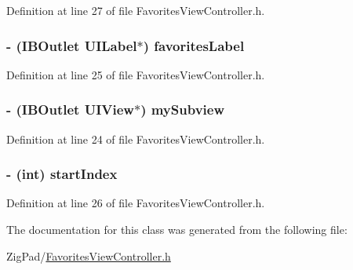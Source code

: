 Definition at line 27 of file FavoritesViewController.h.

\hypertarget{interface_favorites_view_controller_af00ceee5705d944d57b8c8e46d3cca55}{
\subsubsection[{favoritesLabel}]{\setlength{\rightskip}{0pt plus 5cm}-\/ (IBOutlet UILabel$\ast$) favoritesLabel}}
\label{interface_favorites_view_controller_af00ceee5705d944d57b8c8e46d3cca55}


Definition at line 25 of file FavoritesViewController.h.

\hypertarget{interface_favorites_view_controller_acc52a7c4d35472a5e41a1e078081435b}{
\subsubsection[{mySubview}]{\setlength{\rightskip}{0pt plus 5cm}-\/ (IBOutlet UIView$\ast$) mySubview}}
\label{interface_favorites_view_controller_acc52a7c4d35472a5e41a1e078081435b}


Definition at line 24 of file FavoritesViewController.h.

\hypertarget{interface_favorites_view_controller_a01f10c7a68420aff91a418cf1f39de6f}{
\subsubsection[{startIndex}]{\setlength{\rightskip}{0pt plus 5cm}-\/ (int) startIndex}}
\label{interface_favorites_view_controller_a01f10c7a68420aff91a418cf1f39de6f}


Definition at line 26 of file FavoritesViewController.h.



The documentation for this class was generated from the following file:\begin{DoxyCompactItemize}
\item 
ZigPad/\hyperlink{_favorites_view_controller_8h}{FavoritesViewController.h}\end{DoxyCompactItemize}
